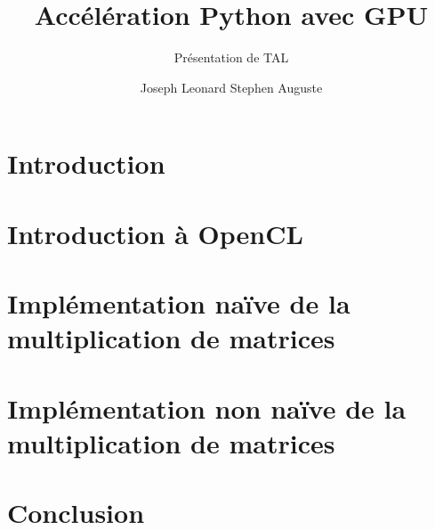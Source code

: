 \documentclass[8pt]{beamer}
\title{Accélération Python avec GPU}
\subtitle{Présentation de TAL}
\author{Joseph Leonard Stephen Auguste}
\begin{document}
\maketitle

\section{Introduction}


\section{Introduction à OpenCL}


\section{Implémentation naïve de la multiplication de matrices}


\section{Implémentation non naïve de la multiplication de matrices}


\section{Conclusion}

\end{document}

